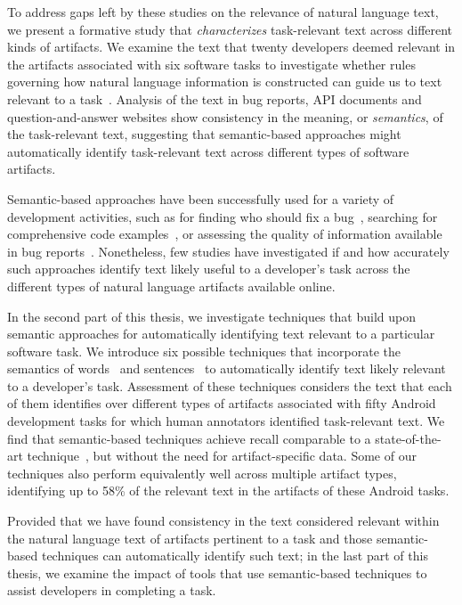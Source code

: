 To address gaps left by these studies on the relevance of natural language text,
we present a formative study that \textit{characterizes} task-relevant text 
across different kinds of artifacts. 
We examine the text that twenty developers deemed relevant in the  artifacts  associated with six software tasks to investigate whether 
rules governing how natural language information
is constructed can guide us to text relevant to a task~\cite{Kintsch1978a}.
Analysis of the  text  in bug
reports, API documents and question-and-answer websites 
 show consistency in the meaning, or \textit{semantics}, of the
task-relevant text, suggesting that 
semantic-based approaches might automatically identify
task-relevant text across different types of software artifacts.







Semantic-based approaches have been successfully used for a variety of development activities,
such as for finding who should fix a bug~\cite{yang2016}, searching for comprehensive code examples~\cite{silva2019}, or assessing the quality of information available in bug reports~\cite{chaparro2019}.
Nonetheless, few studies have investigated if and how accurately such approaches identify
text likely 
useful to a developer's task across the different types of natural language artifacts available online.


In the second part of this thesis, we investigate
techniques that build upon semantic approaches 
for automatically identifying text relevant to a particular software task.
We introduce six possible techniques that incorporate the semantics of words~\cite{Mikolov2013, Devlin2018Bert}
and sentences~\cite{fillmore1976frame, marques2021}
to automatically identify text likely relevant to a developer's task.
Assessment of these techniques considers the text that each of them identifies
 over different types of artifacts
associated with fifty Android development tasks 
for which human annotators identified task-relevant text.
We find that semantic-based techniques
achieve recall comparable to a state-of-the-art technique~\cite{Xu2017}, but without the need for artifact-specific data. Some of our techniques also perform equivalently well across
multiple artifact types, identifying up to 58\%
of the relevant text in the artifacts of these Android tasks.





Provided that we have found consistency in the text considered relevant within the natural language text of artifacts pertinent to a task and those semantic-based techniques can automatically identify such text; in the last part of this thesis, we examine the impact of tools that use semantic-based techniques to assist developers in 
completing a task. 



